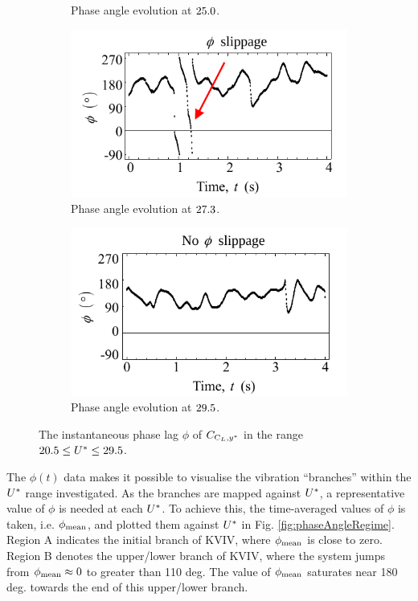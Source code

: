 \documentclass[oneside]{utmthesis}
\begin{document}
\begin{figure}[H]
\begin{subfigure}[b]{0.48\textwidth}
    \caption{Phase angle evolution at $25.0$.}
    \label{fig:phaseAngle-c}
  \end{subfigure}
  \hfill
  \begin{subfigure}[b]{0.48\textwidth}
    \includegraphics[width=1\textwidth]{figs/phaseAngle-d}
    \caption{Phase angle evolution at $27.3$.}
    \label{fig:phaseAngle-d}
  \end{subfigure}
  \hfill
  \begin{subfigure}[b]{0.48\textwidth}
    \includegraphics[width=1\textwidth]{figs/phaseAngle-e}
    \caption{Phase angle evolution at $29.5$.}
    \label{fig:phaseAngle-e}
  \end{subfigure}
  \caption{The instantaneous phase lag $\phi$ of $C_{\text{C}_{L},y^{*}}$ in the range $20.5 \leq U^{*} \leq 29.5$.}
  \label{fig:phaseAngle}
\end{figure}

The $\phi(t)$ data makes it possible to visualise the vibration ``branches'' within the $U^{*}$ range investigated. As the branches are mapped against $U^{*}$, a representative value of $\phi$ is needed at each $U^{*}$. To achieve this, the time-averaged values of $\phi$ is taken, i.e. $\phi_{\text{mean}}$, and plotted them against $U^{*}$ in Fig. \ref{fig:phaseAngleRegime}. Region A indicates the initial branch of  KVIV, where  $\phi_{\text{mean}}$ is close to zero. Region B denotes the upper/lower branch of  KVIV, where the system jumps from  $\phi_{\text{mean}} \approx 0$ to greater than 110 deg. The value of $\phi_{\text{mean}}$ saturates near 180 deg. towards the end of this upper/lower branch.
\end{document}
